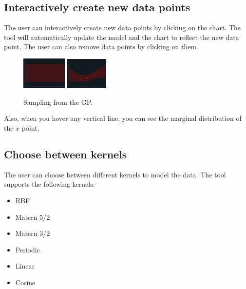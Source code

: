 \documentclass[preprint,journal]{vgtc}       %
\begin{document}
\subsection{Interactively create new data points}

The user can interactively create new data points by clicking on the chart. The tool will automatically update the model and the chart to reflect the new data point. The user can also remove data points by clicking on them.

\begin{figure}[H]
  \centering
  \includegraphics[width=0.2\textwidth]{../imgs/observing.png}
  \includegraphics[width=0.19\textwidth]{../imgs/observed.png}
  \caption{Sampling from the GP.}
\end{figure}

Also, when you hover any vertical line, you can see the marginal distribution of the $x$ point.

\subsection{Choose between kernels}

The user can choose between different kernels to model the data. The tool supports the following kernels:

\begin{multicols}{2}

\begin{itemize}
  \item RBF
  \item Matern 5/2
  \item Matern 3/2
  \item Periodic
  \item Linear
  \item Cosine
\end{itemize}

\end{multicols}
\end{document}
